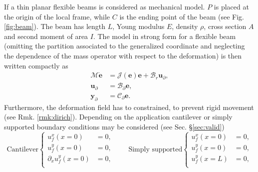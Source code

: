 \documentclass{svjour3}                     %
\newcommand{\secref}[1]{\S\ref{#1}}
\begin{document}
If a thin planar flexible beams is considered as mechanical model. $P$ is placed at the origin of the local frame, while $C$ is the ending point of the beam (see Fig. \ref{fig:beam}). The beam has length $L$, Young modulus $E$, density $\rho$, cross section $A$ and second moment of area $I$. The model in strong form for a flexible beam (omitting the partition associated to the generalized coordinate and neglecting the dependence of the mass operator with respect to the deformation) is then written compactly as 
\begin{equation}
\label{eq:EB_str_phdae}
\begin{aligned}
\bm{\mathcal{M}} \dot{\bm{e}} &= \bm{\mathcal{J}}(\bm{e}) \bm{e} + \bm{\mathcal{B}}_r \bm{u}_\partial, \\
\bm{u}_\partial &= \bm{\mathcal{B}}_{\partial} \bm{e}, \\
\bm{y}_\partial &= \bm{\mathcal{C}}_{\partial} \bm{e}.
\end{aligned}
\end{equation}
Furthermore, the deformation field has to constrained, to prevent rigid movement (see Rmk. \ref{rmk:dirich}). Depending on the application cantilever or simply supported boundary conditions may be considered (see Sec. \secref{sec:valid})
\begin{equation*}
	\text{Cantilever}
	\begin{cases}
	u_f^x(x=0) &= 0, \\
	u_f^y(x=0) &= 0, \\
	\partial_x u_f^y(x=0) &= 0, \\
	\end{cases} \qquad 
	\text{Simply supported}
	\begin{cases}
	u_f^x(x=0) &= 0, \\
	u_f^y(x=0) &= 0, \\
	u_f^y(x=L) &= 0, \\
	\end{cases}
\end{equation*}
\end{document}
